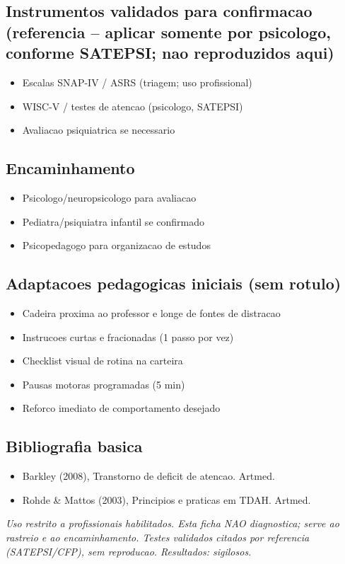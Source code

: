 \documentclass[a4paper,11pt]{book}
\newcommand{\avisolegal}{\par\medskip\noindent\footnotesize\itshape
\color{cinza}Uso restrito a profissionais habilitados. Esta ficha NAO diagnostica;
serve ao rastreio e ao encaminhamento. Testes validados citados por referencia
(SATEPSI/CFP), sem reproducao. Resultados: sigilosos.\color{black}\par}
\begin{document}
\subsection*{Instrumentos validados para confirmacao (referencia -- aplicar somente por psicologo, conforme SATEPSI; nao reproduzidos aqui)}
\begin{itemize}
\item Escalas SNAP-IV / ASRS (triagem; uso profissional)
\item WISC-V / testes de atencao (psicologo, SATEPSI)
\item Avaliacao psiquiatrica se necessario
\end{itemize}
\subsection*{Encaminhamento}
\begin{itemize}
\item Psicologo/neuropsicologo para avaliacao
\item Pediatra/psiquiatra infantil se confirmado
\item Psicopedagogo para organizacao de estudos
\end{itemize}
\subsection*{Adaptacoes pedagogicas iniciais (sem rotulo)}
\begin{itemize}
\item Cadeira proxima ao professor e longe de fontes de distracao
\item Instrucoes curtas e fracionadas (1 passo por vez)
\item Checklist visual de rotina na carteira
\item Pausas motoras programadas (5 min)
\item Reforco imediato de comportamento desejado
\end{itemize}
\subsection*{Bibliografia basica}
\begin{itemize}
\item Barkley (2008), Transtorno de deficit de atencao. Artmed.
\item Rohde \& Mattos (2003), Principios e praticas em TDAH. Artmed.
\end{itemize}
\avisolegal
\end{document}
